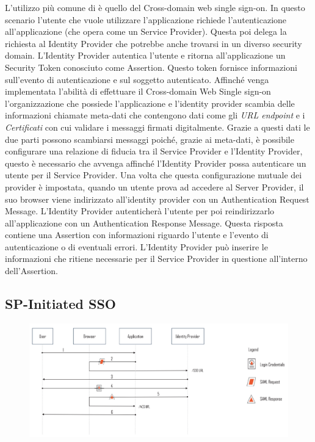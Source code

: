 L'utilizzo più comune di \saml{} è quello del Cross-domain web single sign-on.
In questo scenario l'utente che vuole utilizzare l'applicazione richiede l'autenticazione
all'applicazione (che opera come un \saml{} Service Provider). Questa poi delega la
richiesta al \saml{} Identity Provider che potrebbe anche trovarsi in un diverso
security domain. L'Identity Provider autentica l'utente e ritorna all'applicazione
un Security Token conosciuto come \saml{} Assertion. Questo token fornisce informazioni
sull'evento di autenticazione e sul soggetto autenticato. Affinché  venga implementata
l'abilità di effettuare il Cross-domain Web Single sign-on l'organizzazione che possiede
l'applicazione e l'identity provider scambia delle informazioni chiamate meta-dati
che contengono dati come gli \textit{URL endpoint} e i \textit{Certificati}
con cui validare i messaggi firmati digitalmente. Grazie a questi dati le due parti
possono scambiarsi messaggi poiché, grazie ai meta-dati, è possibile configurare
una relazione di fiducia tra il Service Provider e l'Identity Provider, questo è
necessario che avvenga affinché l'Identity Provider possa autenticare un utente
per il Service Provider. Una volta che questa configurazione mutuale dei provider
è impostata, quando un utente prova ad accedere al Server Provider, il suo
browser viene indirizzato all'identity provider con un \saml{} Authentication Request
Message. L'Identity Provider autenticherà l'utente per poi reindirizzarlo
all'applicazione con un \saml{} Authentication Response Message. Questa risposta
contiene una \saml{} Assertion con informazioni riguardo l'utente e l'evento di
autenticazione o di eventuali errori. L'Identity Provider può inserire le informazioni
che ritiene necessarie per il Service Provider in questione
all'interno dell'Assertion.

\subsection{SP-Initiated SSO}

\begin{figure}[H]
      \centering
      \includegraphics[width=\textwidth, keepaspectratio]{capitoli/id_managing/imgs/spsso.png}
\end{figure}

